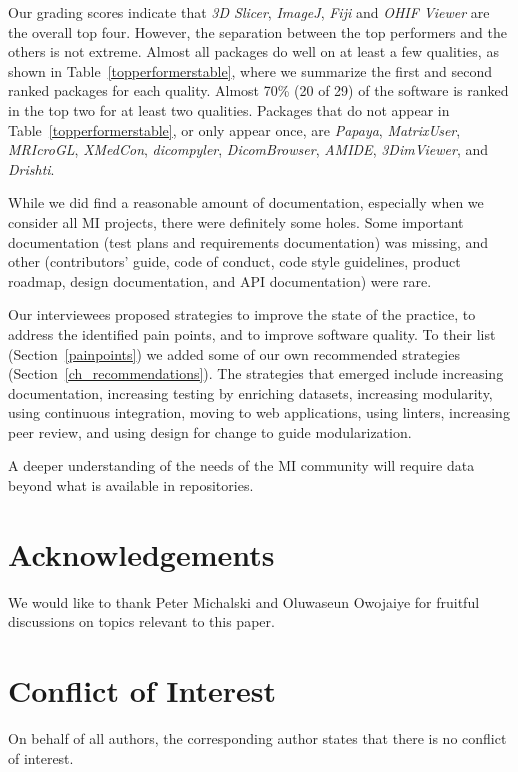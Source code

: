 \documentclass[draft, 12pt, 3p, times]{elsarticle} %
\begin{document}
Our grading scores indicate that \textit{3D Slicer}, \textit{ImageJ},
\textit{Fiji} and \textit{OHIF Viewer} are the overall top four.  However, the
separation between the top performers and the others is not extreme.  Almost all
packages do well on at least a few qualities, as shown in
Table~\ref{topperformerstable}, where we summarize the first and second ranked
packages for each quality. Almost 70\% (20 of 29) of the software 
is ranked in the top two for at least two qualities.  Packages that do not
appear in Table~\ref{topperformerstable}, or only appear once, are
\textit{Papaya}, \textit{MatrixUser}, \textit{MRIcroGL}, \textit{XMedCon},
\textit{dicompyler}, \textit{DicomBrowser}, \textit{AMIDE}, \textit{3DimViewer},
and \textit{Drishti}.

While we did find a reasonable amount of documentation, especially when we
consider all MI projects, there were definitely some holes. Some important
documentation (test plans and requirements documentation) was missing, and other
(contributors' guide, code of conduct, code style guidelines, product roadmap,
design documentation, and API documentation) were rare.

Our interviewees proposed strategies to improve the state of the practice, to
address the identified pain points, and to improve software quality. To their
list (Section~\ref{painpoints}) we added some of our own recommended strategies
(Section~\ref{ch_recommendations}). The strategies that emerged include
increasing documentation, increasing testing by enriching datasets, increasing
modularity, using continuous integration, moving to web applications, using
linters, increasing peer review, and using design for change to guide
modularization.

A deeper understanding of the needs of the MI community will require data beyond
what is available in repositories.

\section*{Acknowledgements}

We would like to thank Peter Michalski and Oluwaseun Owojaiye for fruitful
discussions on topics relevant to this paper.

\section*{Conflict of Interest}

On behalf of all authors, the corresponding author states that there is no
conflict of interest.



\end{document}
